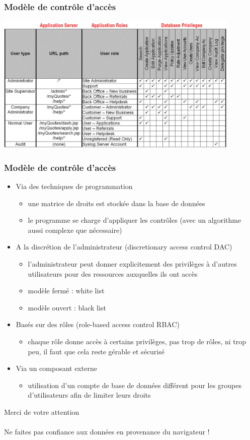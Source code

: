 \documentclass[aspectratio=169]{beamer}  %
\begin{document}
\begin{frame}
  \frametitle{Modèle de contrôle d'accès}
  \begin{center}
    \includegraphics[height=18em]{matrice-droit}
  \end{center}
\end{frame}

\begin{frame}
  \frametitle{Modèle de contrôle d'accès}
  \begin{itemize}
    \item Via des techniques de programmation
    \begin{itemize}
      \item une matrice de droits est stockée dans la base de données 
      \item le programme se charge d'appliquer les contrôles (avec un algorithme aussi complexe que nécessaire)
    \end{itemize}
    \pause
    \item A la discrétion de l'administrateur (discretionary access control DAC)
    \begin{itemize}
      \item l'administrateur peut donner explicitement des privilèges à d'autres utilisateurs pour des ressources auxquelles ils ont accès
      \item modèle fermé : white list
      \item modèle ouvert : black list
    \end{itemize}
    \pause
    \item Basés sur des rôles (role-based access control RBAC)
    \begin{itemize}
      \item chaque rôle donne accès à certains privilèges, pas trop de rôles, ni trop peu, il faut que cela reste gérable et sécurisé
    \end{itemize}
    \pause
    \item Via un composant externe
    \begin{itemize}
      \item utilisation d'un compte de base de données différent pour les groupes d'utilisateurs afin de limiter leurs droits
    \end{itemize}
  \end{itemize}
\end{frame}

\begin{frame}[noframenumbering]
  \begin{center}
    \Huge Merci de votre attention
    \\~\\
    \LARGE Ne faites pas confiance aux données en provenance du navigateur !
  \end{center}
\end{frame}
\end{document}
